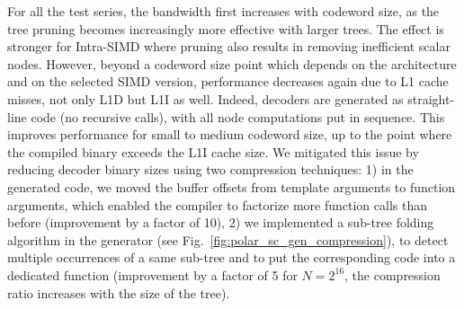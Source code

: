 For all the test series, the bandwidth first increases with codeword size, as
the tree pruning becomes increasingly more effective with larger trees. The
effect is stronger for Intra-SIMD where pruning also results in removing
inefficient scalar nodes. However, beyond a codeword size point which depends on
the architecture and on the selected SIMD version, performance decreases again
due to L1 cache misses, not only L1D but L1I as well. Indeed, decoders are
generated as straight-line code (no recursive calls), with all node computations
put in sequence. This improves performance for small to medium codeword size, up
to the point where the compiled binary exceeds the L1I cache size. We mitigated
this issue by reducing decoder binary sizes using two compression techniques: 1)
in the generated code, we moved the buffer offsets from template arguments to
function arguments, which enabled the compiler to factorize more function calls
than before (improvement by a factor of 10), 2) we implemented a sub-tree
folding algorithm in the generator (see
Fig.~\ref{fig:polar_sc_gen_compression}), to detect multiple occurrences of a
same sub-tree and to put the corresponding code into a dedicated function
(improvement by a factor of 5 for $N=2^{16}$, the compression ratio increases
with the size of the tree).

